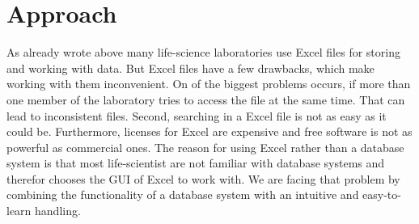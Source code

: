 \documentclass{bioinfo}
\begin{document}
\section{Approach}

As already wrote above many life-science laboratories use Excel files for storing and working with 
data. But Excel files have a few drawbacks, which make working with them inconvenient. On of the 
biggest problems occurs, if more than one member of the laboratory tries to access the file at the 
same time. That can lead to inconsistent files. Second, searching in a Excel file is not as easy as 
it could be. Furthermore, licenses for Excel are expensive and free software is not as powerful as 
commercial ones. The reason for using Excel rather than a database system is that most life-scientist 
are not familiar with database systems and therefor chooses the GUI of Excel to work with. We are 
facing that problem by combining the functionality of a database system with an intuitive and 
easy-to-learn handling.
\end{document}
